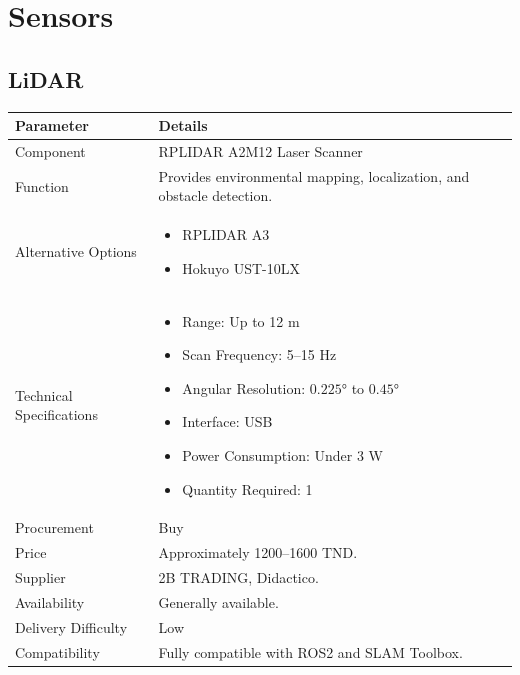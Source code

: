 \documentclass[12pt,a4paper]{article}
\begin{document}
\section{Sensors}
\subsection{LiDAR}

\begin{longtable}{|p{4cm}|p{10cm}|}
\hline
\textbf{Parameter} & \textbf{Details} \\
\hline

Component &
RPLIDAR A2M12 Laser Scanner \\
\hline

Function &
Provides environmental mapping, localization, and obstacle detection. \\
\hline


Alternative Options &
\begin{itemize}
\item RPLIDAR A3
\item Hokuyo UST-10LX
\end{itemize}
\\
\hline

Technical Specifications &
\begin{itemize}
\item Range: Up to 12 m
\item Scan Frequency: 5--15 Hz
\item Angular Resolution: $0.225°$ to $0.45°$
\item Interface: USB
\item Power Consumption: Under 3 W
\item Quantity Required: 1
\end{itemize}
\\
\hline

Procurement &
Buy \\
\hline

Price &
Approximately 1200--1600 TND. \\
\hline

Supplier &
2B TRADING, Didactico. \\
\hline

Availability &
Generally available. \\
\hline

Delivery Difficulty &
Low \\
\hline

Compatibility &
Fully compatible with ROS2 and SLAM Toolbox. \\
\hline


\end{longtable}
\end{document}

